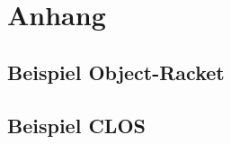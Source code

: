 \appendix
\chapter{Anhang}
\section{Beispiel Object-Racket}
\label{or-example}


\section{Beispiel CLOS}
\label{clos-example}


\cleardoublepage